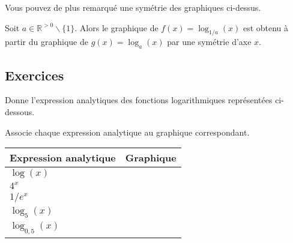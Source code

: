 \documentclass[a4paper,12pt,singlepage]{report}
\newcommand{\IR}{\mathbb{R}}
\begin{document}
Vous pouvez de plus remarqué une symétrie des graphiques ci-dessus.
\begin{propriete}
Soit \(a\in\IR^{>0}\backslash\{1\}\). Alors le graphique de
\(f(x)=\log_{1/a}(x)\) est obtenu à partir du graphique de \(g(x)=\log_a(x)\)
par une symétrie d'axe \(x\).
\end{propriete}
\newpage
\subsection{Exercices}
\label{sec:org4b81a98}
\begin{exercice}
Donne l'expression analytiques des fonctions logarithmiques représentées
ci-dessous.
\begin{center}

\end{center}
\end{exercice}

\begin{exercice}
Associe chaque expression analytique au graphique correspondant.
\begin{center}
\begin{tabular}{|l|l|}
\hline
Expression analytique & Graphique \\ \hline
$\log(x)$             &           \\ \hline
$4^x$                 &           \\ \hline
$1/e^x$               &           \\ \hline
$\log_5(x)$           &           \\ \hline
$\log_{0,5}(x)$       &           \\ \hline
\end{tabular}
\end{center}

\begin{center}

\end{center}
\end{exercice}
\end{document}
